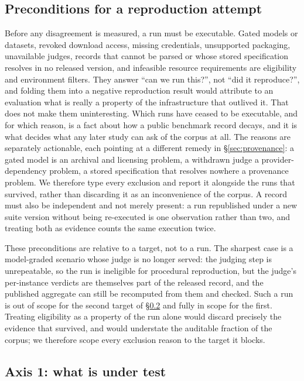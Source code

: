 \subsection{Preconditions for a reproduction attempt}
\label{sec:preconditions}

Before any disagreement is measured, a run must be executable. Gated models or datasets, revoked download access, missing credentials, unsupported packaging, unavailable judges, records that cannot be parsed or whose stored specification resolves in no released version, and infeasible resource requirements are eligibility and environment filters. They answer ``can we run this?'', not ``did it reproduce?'', and folding them into a negative reproduction result would attribute to an evaluation what is really a property of the infrastructure that outlived it. That does not make them uninteresting. Which runs have ceased to be executable, and for which reason, is a fact about how a public benchmark record decays, and it is what decides what any later study can ask of the corpus at all. The reasons are separately actionable, each pointing at a different remedy in \S\ref{sec:provenance}: a gated model is an archival and licensing problem, a withdrawn judge a provider-dependency problem, a stored specification that resolves nowhere a provenance problem. We therefore type every exclusion and report it alongside the runs that survived, rather than discarding it as an inconvenience of the corpus. A record must also be independent and not merely present: a run republished under a new suite version without being re-executed is one observation rather than two, and treating both as evidence counts the same execution twice.

These preconditions are relative to a target, not to a run. The sharpest case is a model-graded scenario whose judge is no longer served: the judging step is unrepeatable, so the run is ineligible for procedural reproduction, but the judge's per-instance verdicts are themselves part of the released record, and the published aggregate can still be recomputed from them and checked. Such a run is out of scope for the second target of \S\ref{sec:targets} and fully in scope for the first. Treating eligibility as a property of the run alone would discard precisely the evidence that survived, and would understate the auditable fraction of the corpus; we therefore scope every exclusion reason to the target it blocks.

\subsection{Axis 1: what is under test}
\label{sec:targets}

